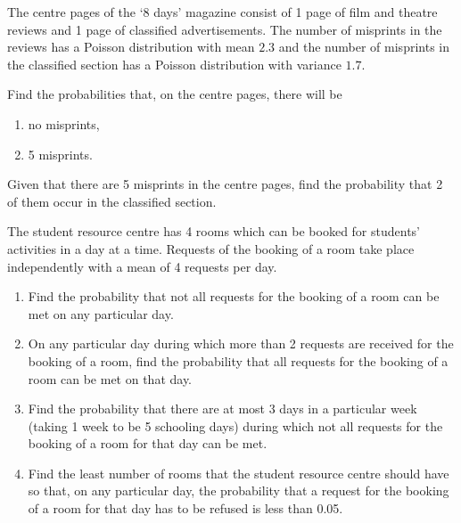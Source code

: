 \begin{problem}
    The centre pages of the `8 days' magazine consist of 1 page of film and theatre reviews and 1 page of classified advertisements. The number of misprints in the reviews has a Poisson distribution with mean $2.3$ and the number of misprints in the classified section has a Poisson distribution with variance $1.7$.

    Find the probabilities that, on the centre pages, there will be
    \begin{enumerate}
        \item no misprints,
        \item 5 misprints.
    \end{enumerate}

    Given that there are 5 misprints in the centre pages, find the probability that 2 of them occur in the classified section.
\end{problem}

\begin{problem}
    The student resource centre has 4 rooms which can be booked for students' activities in a day at a time. Requests of the booking of a room take place independently with a mean of 4 requests per day.

    \begin{enumerate}
        \item Find the probability that not all requests for the booking of a room can be met on any particular day.
        \item On any particular day during which more than 2 requests are received for the booking of a room, find the probability that all requests for the booking of a room can be met on that day.
        \item Find the probability that there are at most 3 days in a particular week (taking 1 week to be 5 schooling days) during which not all requests for the booking of a room for that day can be met.
        \item Find the least number of rooms that the student resource centre should have so that, on any particular day, the probability that a request for the booking of a room for that day has to be refused is less than 0.05.
    \end{enumerate}
\end{problem}

